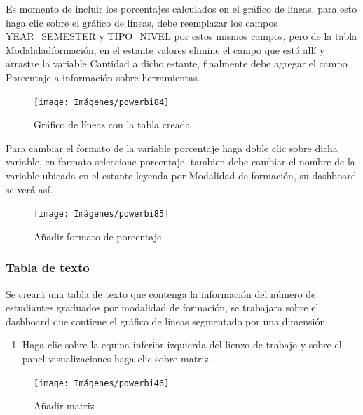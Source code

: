 \documentclass[
]{book}
\providecommand{\tightlist}{%
  \setlength{\itemsep}{0pt}\setlength{\parskip}{0pt}}
\begin{document}
Es momento de incluir los porcentajes calculados en el gráfico de líneas, para esto haga clic sobre el gráfico de líneas, debe reemplazar los campos YEAR\_SEMESTER y TIPO\_NIVEL por estos mismos campos, pero de la tabla Modalidadformación, en el estante valores elimine el campo que está allí y arrastre la variable Cantidad a dicho estante, finalmente debe agregar el campo Porcentaje a información sobre herramientas.

\begin{figure}

{\centering \texttt{[image: Imágenes/powerbi84]} 

}

\caption{Gráfico de líneas con la tabla creada}\label{fig:reemplazarvariablescontablamodalidadformacion-fig}
\end{figure}

Para cambiar el formato de la variable porcentaje haga doble clic sobre dicha variable, en formato seleccione porcentaje, tambien debe cambiar el nombre de la variable ubicada en el estante leyenda por Modalidad de formación, su dashboard se verá así.

\begin{figure}

{\centering \texttt{[image: Imágenes/powerbi85]} 

}

\caption{Añadir formato de porcentaje}\label{fig:formatoporcentaje-fig}
\end{figure}

\hypertarget{tabladetextopowerbi}{%
\subsubsection{Tabla de texto}\label{tabladetextopowerbi}}

Se creará una tabla de texto que contenga la información del número de estudiantes graduados por modalidad de formación, se trabajara sobre el dashboard que contiene el gráfico de líneas segmentado por una dimensión.

\begin{enumerate}
\def\labelenumi{\arabic{enumi}.}
\tightlist
\item
  Haga clic sobre la equina inferior izquierda del lienzo de trabajo y sobre el panel visualizaciones haga clic sobre matriz.
\end{enumerate}

\begin{figure}

{\centering \texttt{[image: Imágenes/powerbi46]} 

}

\caption{Añadir matriz}\label{fig:paso1matriz-fig}
\end{figure}
\end{document}
